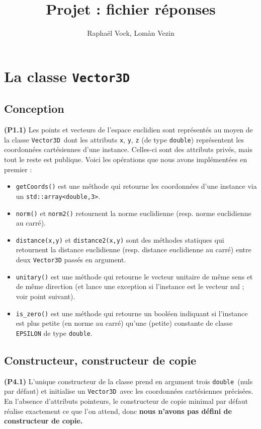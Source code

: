 \documentclass[12pt, letterpaper, twoside]{article}
\title{Projet : fichier réponses}
\author{Raphaël Vock, Lomàn Vezin}
\newcommand{\T}[1]{\texttt{#1}}
\newcommand{\V}[0]{\texttt{Vector3D}}
\newcommand{\double}{\texttt{double}}
\begin{document}
\maketitle
\section{La classe \T{Vector3D}}
\subsection{Conception}
\noindent \textbf{(P1.1)} Les points et vecteurs de l'espace euclidien sont représentés au moyen de la classe \V\ dont les attributs \T{x}, \T{y}, \T{z} (de type \double) représentent les coordonnées cartésiennes d'une instance. Celles-ci sont des attributs privés, mais tout le reste est publique. Voici les opérations que nous avons implémentées en premier :

\begin{itemize}

\item \T{getCoords()}  est une méthode qui retourne les coordonnées d'une instance via un \T{std::array<double,3>}.

\item \T{norm()} et \T{norm2()} retournent la norme euclidienne (resp. norme euclidienne au carré).

\item \T{distance(x,y)} et \T{distance2(x,y)} sont des méthodes statiques qui retournent la distance euclidienne (resp. distance euclidienne au carré) entre deux \T{Vector3D} passés en argument.

\item \T{unitary()} est une méthode qui retourne le vecteur unitaire de même sens et de même direction (et lance une exception si l'instance est le vecteur nul ; voir point suivant).

\item \T{is\_zero()} est une méthode qui retourne un booléen indiquant si l'instance est plus petite (en norme au carré) qu'une (petite) constante de classe \T{EPSILON} de type \double.
\end{itemize}

\subsection{Constructeur, constructeur de copie}
\noindent \textbf{(P4.1)} L'unique constructeur de la classe prend en argument trois \double\ (nuls par défaut) et initialise un \V\ avec les coordonnées cartésiennes précisées. En l'absence d'attributs pointeurs, le constructeur de copie minimal par défaut réalise exactement ce que l'on attend, donc \textbf{nous n'avons pas défini de constructeur de copie.}
\end{document}
